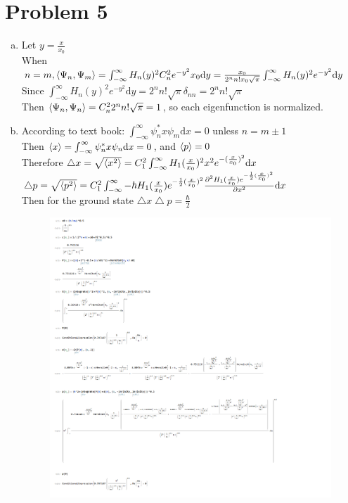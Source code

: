 \documentclass[a4paper]{article}
\begin{document}
\section{Problem 5}
    \begin{enumerate}[(a)]
        \item Let $y=\frac{x}{x_0}$
        \\When $n=m,\braket{\Psi_n,\Psi_m}=\int_{-\infty}^\infty H_n(y)^2C_n^2e^{-y^2}x_0\mathrm{d}y=\frac{x_0}{2^nn!x_0\sqrt{\pi}}\int_{-\infty}^\infty H_n(y)^2e^{-y^2}\mathrm{d}y$
        \\Since $\int_{-\infty}^\infty H_n(y)^2e^{-y^2}\mathrm{d}y=2^nn!\sqrt{\pi}\delta_{nn}=2^nn!\sqrt{\pi}$
        \\Then $\braket{\Psi_n,\Psi_n}=C_n^22^nn!\sqrt{\pi}=1$, so each eigenfunction is normalized.
        \item According to text book: $\int_{-\infty}^\infty\psi_n^*x\psi_m\mathrm{d}x=0$ unless $n=m\pm1$
        \\Then $\braket{x}=\int_{-\infty}^\infty\psi_n^*x\psi_n\mathrm{d}x=0$, and $\braket{p}=0$
        \\Therefore $\bigtriangleup x=\sqrt{\braket{x^2}}=C_1^2\int_{-\infty}^\infty H_1(\frac{x}{x_0})^2x^2e^{-(\frac{x}{x_0})^2}\mathrm{d}x$
        \\$\bigtriangleup p=\sqrt{\braket{p^2}}=C_1^2\int_{-\infty}^\infty -\hbar H_1(\frac{x}{x_0})e^{-\frac{1}{2}(\frac{x}{x_0})^2}\frac{\partial^2H_1(\frac{x}{x_0})e^{-\frac{1}{2}(\frac{x}{x_0})^2}}{\partial x^2}\mathrm{d}x$
        \\Then for the ground state $\bigtriangleup x\bigtriangleup p=\frac{\hbar}{2}$
        \begin{figure}[H]
            \centering
            \includegraphics[scale=0.25]{P2.png}

\end{figure}
\end{enumerate}
\end{document}
